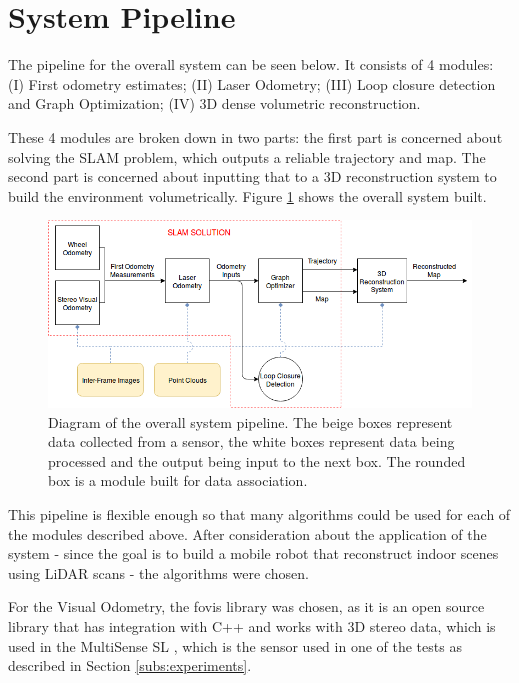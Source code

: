\documentclass[12pt]{article}
\begin{document}
	\newpage
	\section{System Pipeline} \label{pipeline}

The pipeline for the overall system can be seen below. It consists of 4 modules: (I) First odometry estimates; (II) Laser Odometry; (III) Loop closure detection and Graph Optimization; (IV) 3D dense volumetric reconstruction.

These 4 modules are broken down in two parts: the first part is concerned about solving the SLAM problem, which outputs a reliable trajectory and map. The second part is concerned about inputting that to a 3D reconstruction system to build the environment volumetrically. Figure \ref{fig:SystemPipelineFigure1} shows the overall system built.

\begin{figure}[h]
\includegraphics[width=\linewidth]{SystemPipeline}
\caption{Diagram of the overall system pipeline. The beige boxes represent data collected from a sensor, the white boxes represent data being processed and the output being input to the next box. The rounded box is a module built for data association.}
\label{fig:SystemPipelineFigure1}
\end{figure}
	
This pipeline is flexible enough so that many algorithms could be used for each of the modules described above. After consideration about the application of the system - since the goal is to build a mobile robot that reconstruct indoor scenes using LiDAR scans - the algorithms were chosen.
	
For the Visual Odometry, the fovis library \cite{fovis} was chosen, as it is an open source library that has integration with C++ and works with 3D stereo data, which is used in the MultiSense SL \cite{multisense}, which is the sensor used in one of the tests as described in Section \ref{subs:experiments}.
	
\end{document}
